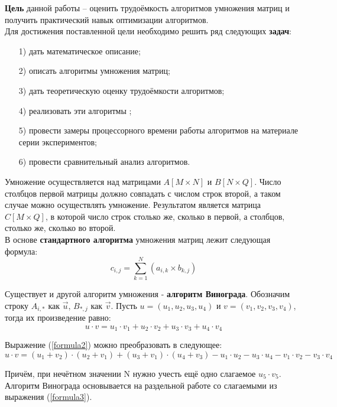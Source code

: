 \textbf{Цель} данной работы – оценить трудоёмкость алгоритмов умножения матриц и получить практический навык оптимизации алгоритмов.\\

Для достижения поставленной цели необходимо решить ряд следующих \textbf{задач}:
\begin{enumerate}
\item[1)] дать математическое описание;
\item[2)] описать алгоритмы умножения матриц;
\item[3)] дать теоретическую оценку трудоёмкости алгоритмов;
\item[4)] реализовать эти алгоритмы ;
\item[5)] провести замеры процессорного времени работы алгоритмов на материале серии экспериментов;
\item[6)] провести сравнительный анализ алгоритмов.
\end{enumerate}

Умножение осуществляется над матрицами $A[M \times N]$ и $B[N \times Q]$. Число столбцов первой матрицы должно совпадать с числом строк второй, а таком случае можно осуществлять умножение. Результатом является матрица $C[M \times Q]$, в которой число строк столько же, сколько в первой, а столбцов, столько же, сколько во второй.\\

В основе \textbf{стандартного алгоритма} умножения матриц лежит следующая формула:
\begin{equation}\label{formula1}
	c_{i,j} = \sum_{k=1}^{N}(a_{i,k} \times b_{k,j})
\end{equation}

Существует и другой алгоритм умножения - \textbf{алгоритм Винограда}.
Обозначим строку $A_{i,*}$ как $\overrightarrow{u}$, $B_{*,j}$ как $\overrightarrow{v}$.
Пусть $u = (u_1, u_2, u_3, u_4)$ и $v = (v_1, v_2, v_3, v_4)$, тогда их произведение равно:
\begin{equation}\label{formula2}
u \cdot v = u_1 \cdot v_1 + u_2 \cdot v_2 + u_3 \cdot v_3 + u_4 \cdot v_4
\end{equation}

Выражение (\ref{formula2}) можно преобразовать в следующее: 
\begin{equation}\label{formula3}
	u \cdot v = (u_1 + v_2)\cdot(u_2 + v_1) + (u_3 + v_1)\cdot(u_4 + v_3) - u_1\cdot u_2 - u_3\cdot u_4 - v_1\cdot v_2 - v_3\cdot v_4
\end{equation}

Причём, при нечётном значении N нужно учесть ещё одно слагаемое $u_5 \cdot v_5$. \\

Алгоритм Винограда основывается на раздельной работе со слагаемыми из выражения (\ref{formula3}). 